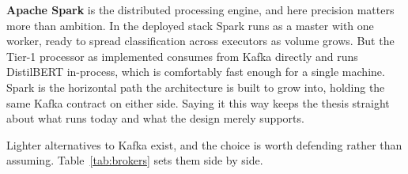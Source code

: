 \textbf{Apache Spark} is the distributed processing engine, and here precision matters more than ambition. In the deployed stack Spark runs as a master with one worker, ready to spread classification across executors as volume grows. But the Tier-1 processor as implemented consumes from Kafka directly and runs DistilBERT in-process, which is comfortably fast enough for a single machine. Spark is the horizontal path the architecture is built to grow into, holding the same Kafka contract on either side. Saying it this way keeps the thesis straight about what runs today and what the design merely supports.

Lighter alternatives to Kafka exist, and the choice is worth defending rather than assuming. Table~\ref{tab:brokers} sets them side by side.
\renewcommand{\arraystretch}{1.5} 

